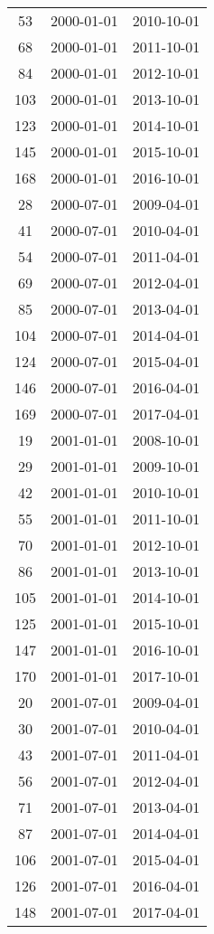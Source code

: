 \begin{tabular}{ccc}
  53 & 2000-01-01 & 2010-10-01 \\ 
  68 & 2000-01-01 & 2011-10-01 \\ 
  84 & 2000-01-01 & 2012-10-01 \\ 
  103 & 2000-01-01 & 2013-10-01 \\ 
  123 & 2000-01-01 & 2014-10-01 \\ 
  145 & 2000-01-01 & 2015-10-01 \\ 
  168 & 2000-01-01 & 2016-10-01 \\ 
  28 & 2000-07-01 & 2009-04-01 \\ 
  41 & 2000-07-01 & 2010-04-01 \\ 
  54 & 2000-07-01 & 2011-04-01 \\ 
  69 & 2000-07-01 & 2012-04-01 \\ 
  85 & 2000-07-01 & 2013-04-01 \\ 
  104 & 2000-07-01 & 2014-04-01 \\ 
  124 & 2000-07-01 & 2015-04-01 \\ 
  146 & 2000-07-01 & 2016-04-01 \\ 
  169 & 2000-07-01 & 2017-04-01 \\ 
  19 & 2001-01-01 & 2008-10-01 \\ 
  29 & 2001-01-01 & 2009-10-01 \\ 
  42 & 2001-01-01 & 2010-10-01 \\ 
  55 & 2001-01-01 & 2011-10-01 \\ 
  70 & 2001-01-01 & 2012-10-01 \\ 
  86 & 2001-01-01 & 2013-10-01 \\ 
  105 & 2001-01-01 & 2014-10-01 \\ 
  125 & 2001-01-01 & 2015-10-01 \\ 
  147 & 2001-01-01 & 2016-10-01 \\ 
  170 & 2001-01-01 & 2017-10-01 \\ 
  20 & 2001-07-01 & 2009-04-01 \\ 
  30 & 2001-07-01 & 2010-04-01 \\ 
  43 & 2001-07-01 & 2011-04-01 \\ 
  56 & 2001-07-01 & 2012-04-01 \\ 
  71 & 2001-07-01 & 2013-04-01 \\ 
  87 & 2001-07-01 & 2014-04-01 \\ 
  106 & 2001-07-01 & 2015-04-01 \\ 
  126 & 2001-07-01 & 2016-04-01 \\ 
  148 & 2001-07-01 & 2017-04-01 \\ 

\end{tabular}
